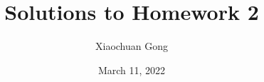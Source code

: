 
\documentclass[11pt]{article}
\usepackage{amsmath,amssymb,amsthm,latexsym}
\usepackage{mathrsfs,mathtools}
\usepackage{graphicx}
\usepackage{comment}
\usepackage{bm}
\usepackage{natbib}
\usepackage{subfigure,multirow}
\usepackage[colorlinks,linkcolor=black,citecolor=black,urlcolor=black]{hyperref}
\usepackage{verbatim}

\renewcommand\baselinestretch{1.25}
\topmargin -.5in
\textheight 9in
\textwidth 6.6in
\oddsidemargin -.25in
\evensidemargin -.25in

\title{Solutions to Homework 2}
\author{Xiaochuan Gong}
\date{March 11, 2022}


\maketitle %

\subsection*{Problem 1}
For a function $f: {\mathbb R}^n \cup\{-\infty, +\infty\}$ the following statements are equivalent:

\noindent (a) $f$ is closed

\noindent (b) $C_\alpha$ is closed for any $\alpha$

